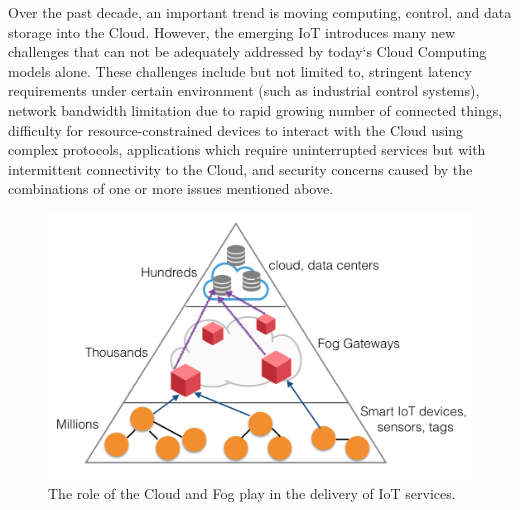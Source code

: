 Over the past decade, an important trend is moving computing, control, and data storage into the Cloud. However, the emerging IoT introduces many new challenges that can not be adequately addressed by today`s Cloud Computing models alone. These challenges \cite{7498684} include but not limited to, stringent latency requirements under certain environment (such as industrial control systems), network bandwidth limitation due to rapid growing number of connected things, difficulty for resource-constrained devices to interact with the Cloud using complex protocols, applications which require uninterrupted services but with intermittent connectivity to the Cloud, and security concerns caused by the combinations of one or more issues mentioned above.

\begin{figure}[!htbp]
\centering
\includegraphics[scale = 0.55]{fog_computing.png}
\caption{The role of the Cloud and Fog play in the delivery of IoT services. \cite{7123563}} 
\label{fig:fog_computing}
\end{figure}

